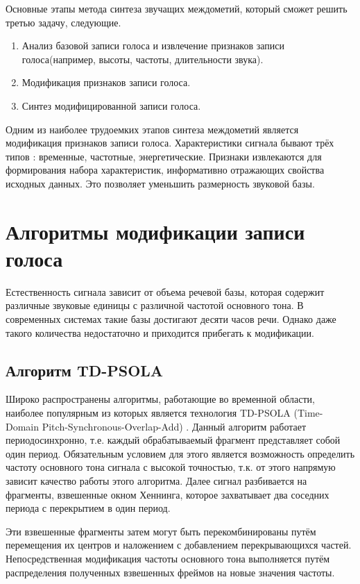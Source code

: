 Основные этапы метода синтеза звучащих междометий, который сможет решить третью задачу, следующие. 
\begin{enumerate}
	\item Анализ базовой записи голоса и извлечение признаков записи голоса(например, высоты, частоты, длительности звука). 
	\item Модификация признаков записи голоса.
	\item Синтез модифицированной записи голоса. 
\end{enumerate}

Одним из наиболее трудоемких этапов синтеза междометий является модификация признаков записи голоса.
Характеристики сигнала бывают трёх типов \cite{param_signals}: временные, частотные, энергетические. 
Признаки извлекаются для формирования набора характеристик, информативно отражающих свойства исходных данных. 
Это позволяет уменьшить размерность звуковой базы. 

\section{Алгоритмы модификации записи голоса}

Естественность сигнала зависит от объема речевой базы, которая содержит различные звуковые единицы с различной частотой основного тона. В современных системах такие базы достигают десяти часов речи. Однако даже такого количества недостаточно и приходится прибегать к модификации.

\subsection{Алгоритм TD-PSOLA}

Широко распространены алгоритмы, работающие во временной области, наиболее популярным из которых является технология TD-PSOLA (Time-Domain Pitch-Synchronous-Overlap-Add) \cite{mod_algo}. Данный алгоритм работает периодосинхронно, т.е. каждый обрабатываемый фрагмент представляет собой один период. Обязательным условием для этого является возможность определить частоту основного тона сигнала с высокой точностью, т.к. от этого напрямую зависит качество работы этого алгоритма. Далее сигнал разбивается на фрагменты, взвешенные окном Хеннинга, которое захватывает два соседних периода с перекрытием в один период.

Эти взвешенные фрагменты затем могут быть перекомбинированы путём перемещения их центров и наложением с добавлением перекрывающихся частей.
Непосредственная модификация частоты основного тона выполняется путём распределения полученных взвешенных фреймов на новые значения частоты. 

